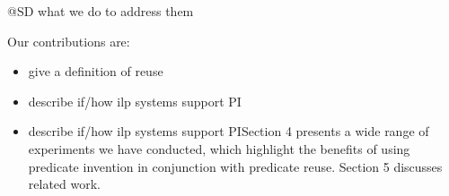 \ac{@SD what we do to address them}

Our contributions are:

\begin{itemize}
\item \ac{give a definition of reuse}

\item \ac{describe if/how ilp systems support PI}

\item \ac{describe if/how ilp systems support PI}Section 4 presents a wide range of experiments we have conducted, which highlight the benefits of using predicate invention in conjunction with predicate reuse. Section 5 discusses related work.
\end{itemize}
